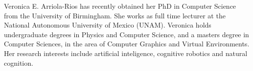 \documentclass[journal]{IEEEtran}
\begin{document}
%
% 
% 

% 

\begin{IEEEbiography}{Veronica E. Arriola-Rios}
  has recently obtained her PhD in Computer Science from the University of Birmingham.
  She works as full time lecturer at the National Autonomous University of Mexico (UNAM).
  Veronica holds undergraduate degrees in Physics and Computer Science, and a masters degree in Computer Sciences, in the area of Computer Graphics and Virtual Environments.
  Her research interests include artificial inteligence, cognitive robotics and natural cognition.
\end{IEEEbiography}
\end{document}
